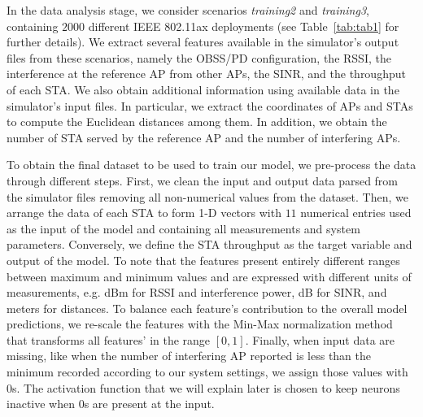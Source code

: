 \documentclass[10pt,a4paper,twocolumn]{article}
\newcommand{\ITUpar}{\vspace{8pt}\par}
\begin{document}
In the data analysis stage, we consider scenarios \textit{training2} and \textit{training3}, containing $2000$ different IEEE 802.11ax deployments (see Table~\ref{tab:tab1} for further details). We extract several features available in the simulator’s output files from these scenarios, namely the OBSS/PD configuration, the RSSI, the interference at the reference AP from other APs, the SINR, and the throughput of each STA. We also obtain additional information using available data in the simulator’s input files. In particular, we extract the coordinates of APs and STAs to compute the Euclidean distances among them. In addition, we obtain the number of STA served by the reference AP and the number of interfering APs.\ITUpar

To obtain the final dataset to be used to train our model, we pre-process the data through different steps. First, we clean the input and output data parsed from the simulator files removing all non-numerical values from the dataset. Then, we arrange the data of each STA to form 1-D vectors with $11$ numerical entries used as the input of the model and containing all measurements and system parameters. Conversely, we define the STA throughput as the target variable and output of the model. To note that the features present entirely different ranges between maximum and minimum values and are expressed with different units of measurements, e.g. dBm for RSSI and interference power, dB for SINR, and meters for distances. To balance each feature's contribution to the overall model predictions, we re-scale the features with the Min-Max normalization method that transforms all features' in the range $[0,1]$. Finally, when input data are missing, like when the number of interfering AP reported is less than the minimum recorded according to our system settings, we assign those values with $0$s. The activation function that we will explain later is chosen to keep neurons inactive when $0$s are present at the input.\ITUpar


\end{document}
